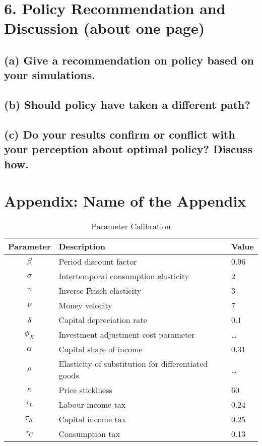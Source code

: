 \documentclass[12pt]{article}
\begin{document}
\section*{6. Policy Recommendation and Discussion (about one page)}
\subsection*{(a) Give a recommendation on policy based on your simulations.}

\subsection*{(b) Should policy have taken a different path?}

\subsection*{(c) Do your results confirm or conflict with your perception about optimal policy? Discuss how.}

\newpage %
\printbibliography{} %

\newpage
\appendix
\section{Appendix: Name of the Appendix}
\begin{table}[ht]
    \centering
    \caption{Parameter Calibration}\label{tab:parameters}
    \begin{tabular}{cll}
        \toprule
        Parameter & Description & Value  \\ \midrule
        $\beta$ & Period discount factor  & 0.96  \\
        $\sigma$ & Intertemporal consumption elasticity  & 2  \\
        $\gamma$ & Inverse Frisch elasticity  & 3  \\
        $\nu$ & Money velocity  & 7  \\
        $\delta$ & Capital depreciation rate  & 0.1  \\
        $\phi_X$ & Investment adjustment cost parameter & \dots  \\
        $\alpha$ & Capital share of income & 0.31  \\
        $\rho$ & Elasticity of substitution for differentiated goods &  \dots  \\
        $\kappa$ & Price stickiness & 60 \\
        ${\tau_L}$ & Labour income tax & 0.24 \\
        ${\tau_K}$ & Capital income tax & 0.25 \\
        ${\tau_C}$ & Consumption tax & 0.13 \\
    \bottomrule
    \end{tabular}
\end{table}
\end{document}

